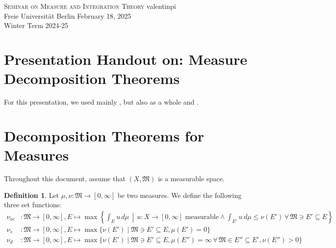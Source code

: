 \documentclass[10pt, leqno]{amsart}
\theoremstyle{definition}
\newtheorem{definition}{Definition}[section]
\theoremstyle{remark}
\begin{document}

    \begin{mdframed}
        \textsc{Seminar on Measure and Integration Theory} \hfill valentinpi\\
        Freie Universität Berlin \hfill February 18, 2025\\
        Winter Term 2024-25
    \end{mdframed}

    \section*{Presentation Handout on: Measure Decomposition Theorems} \phantom{}
    
    For this presentation, we used mainly \cite[pp. 71-76, pp. 113-118]{Fonseca}, but also \cite{Fonseca} as a whole and \cite{Axler,Elstrodt}.

    \section{Decomposition Theorems for Measures} \phantom{}
    
    Throughout this document, assume that \((X, \mathfrak{M})\) is a measurable space.

    \begin{definition} \label{def:basics_on_measure_relations}
        Let \(\mu, \nu\colon \mathfrak{M} \to [0, \infty]\) be two measures. We define the following three set functions:
        \begin{align}
            \nu_{ac}&\colon \mathfrak{M} \to [0, \infty], E \mapsto \max\left\{\int_E u \, d\mu \, \middle\vert \, u\colon X \to [0, \infty] \text{ measurable} \land \int_{E'} u \, d\mu \leq \nu(E') \, \forall \, \mathfrak{M} \ni E' \subseteq E\right\}\\
            \nu_s&\colon \mathfrak{M} \to [0, \infty], E \mapsto \max\{\nu(E') \mid \mathfrak{M} \ni E' \subseteq E, \mu(E') = 0\} \\
            \nu_d&\colon \mathfrak{M} \to [0, \infty], E \mapsto \max\{\nu(E') \mid \mathfrak{M} \ni E' \subseteq E, \mu(E'') = \infty \, \forall \, \mathfrak{M} \in E'' \subseteq E', \nu(E'') > 0\}
        \end{align}
    \end{definition}
\end{document}
